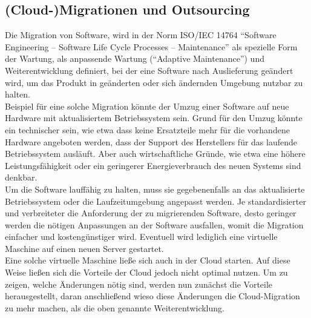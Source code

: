 \subsection{(Cloud-)Migrationen und Outsourcing}
\label{cha:definition_cloud-migration}
Die Migration von Software, wird in der Norm ISO/IEC 14764 "`Software 
Engineering -- Software Life Cycle Processes -- Maintenance"' als spezielle 
Form der Wartung, als anpassende Wartung ("`Adaptive Maintenance"') und 
Weiterentwicklung definiert, bei der eine Software nach Auslieferung geändert 
wird, um das Produkt in geänderten oder sich ändernden Umgebung nutzbar zu 
halten.  \\ 
Beispiel für eine solche Migration könnte der Umzug einer Software auf neue 
Hardware mit aktualisiertem Betriebssystem sein. Grund für den Umzug könnte ein 
technischer sein, wie etwa dass keine Ersatzteile mehr für die vorhandene 
Hardware angeboten werden, dass der Support des Herstellers für das laufende 
Betriebssystem ausläuft. Aber auch wirtschaftliche Gründe, wie etwa eine höhere 
Leistungsfähigkeit oder ein geringerer Energieverbrauch des neuen Systems sind 
denkbar. \\
Um die Software lauffähig zu halten, muss sie 
gegebenenfalls an das aktualisierte Betriebssystem oder die Laufzeitumgebung 
angepasst werden. Je standardisierter und verbreiteter die Anforderung der zu 
migrierenden Software, desto geringer werden die nötigen Anpassungen an der 
Software ausfallen, womit die Migration einfacher und kostengünstiger wird. 
Eventuell wird lediglich eine virtuelle Maschine auf einen neuen Server 
gestartet. \\

Eine solche virtuelle Maschine ließe sich auch in der Cloud starten. Auf 
diese Weise ließen sich die Vorteile der Cloud jedoch nicht optimal nutzen. Um 
zu zeigen, welche Änderungen nötig sind, werden nun zunächst die Vorteile 
herausgestellt, daran anschließend wieso diese Änderungen die Cloud-Migration 
zu mehr machen, als die oben genannte Weiterentwicklung. 

